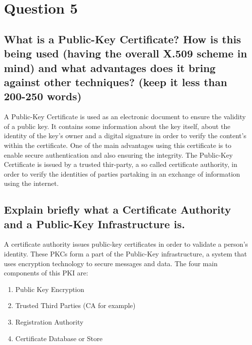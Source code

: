 \documentclass{report}
\begin{document}
	\section{Question 5}
	\startsection
		\renewcommand{\thesubsection}{\thesection.\Alph{subsection}}
		\subsection{What is a Public-Key Certificate? How is this being used (having the overall X.509 scheme in mind) and what advantages does it bring against other techniques? (keep it less than 200-250 words)}
		\startsubsection
			A Public-Key Certificate is used as an electronic document to ensure the validity of a public key. It contains some information about the key itself, about the identity of the key's owner and a digital signature in order to verify the content's within the certificate. One of the main advantages using this certificate is to enable secure authentication and also ensuring the integrity. The Public-Key Certificate is issued by a trusted thir-party, a so called certificate authority, in order to verify the identities of parties partaking in an exchange of information using the internet.
		\closesection
		\subsection{Explain briefly what a Certificate Authority and a Public-Key Infrastructure is.}
		\startsubsection
			A certificate authority issues public-key certificates in order to validate a person's identity. These PKCs form a part of the Public-Key infrastructure, a system that uses encryption technology to secure messages and data. The four main components of this PKI are:
			\begin{enumerate}
				\item Public Key Encryption
				\item Trusted Third Parties (CA for example)
				\item Registration Authority
				\item Certificate Database or Store
			\end{enumerate}
		\closesection
	\closesection
\end{document}
